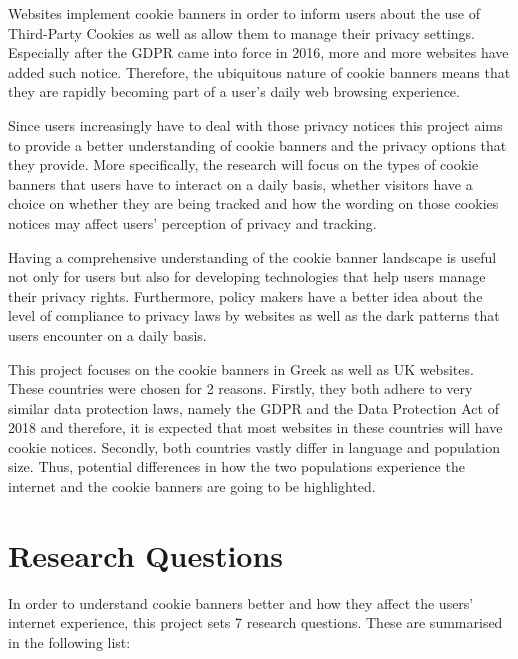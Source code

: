 \documentclass[../main.tex]{subfiles}
\begin{document}
Websites implement cookie banners in order to inform users about the use of Third-Party Cookies as well as allow them to manage their privacy settings. Especially after the GDPR came into force in 2016, more and more websites have added such notice. Therefore, the ubiquitous nature of cookie banners means that they are rapidly becoming part of a user’s daily web browsing experience.

Since users increasingly have to deal with those privacy notices this project aims to provide a better understanding of cookie banners and the privacy options that they provide. More specifically, the research will focus on the types of cookie banners that users have to interact on a daily basis, whether visitors have a choice on whether they are being tracked and how the wording on those cookies notices may affect users’ perception of privacy and tracking. 

Having a comprehensive understanding of the cookie banner landscape is useful not only for users but also for developing technologies that help users manage their privacy rights. Furthermore, policy makers have a better idea about the level of compliance to privacy laws by websites as well as the dark patterns that users encounter on a daily basis.

This project focuses on the cookie banners in Greek as well as UK websites. These countries were chosen for 2 reasons. Firstly, they both adhere to very similar data protection laws, namely the GDPR and the Data Protection Act of 2018 and therefore, it is expected that most websites in these countries will have cookie notices. Secondly, both countries vastly differ in language and population size. Thus, potential differences in how the two populations experience the internet and the cookie banners are going to be highlighted.

\section{Research Questions}

In order to understand cookie banners better and how they affect the users’ internet experience, this project sets 7 research questions. These are summarised in the following list:
\end{document}
